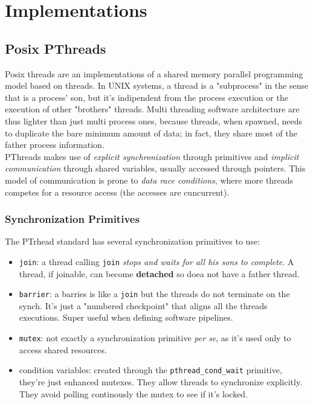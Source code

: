 \documentclass{article}
\begin{document}
	
	\clearpage
	\section{Implementations}
		\subsection{Posix PThreads}
			Posix threads are an implementations of a shared memory parallel programming model based on threads. In UNIX systems, a thread is a "subprocess" in the sense that is a process' son, but it's indipendent from the process execution or the execution of other "brothers" threads. Multi threading software architecture are thus lighter than just multi process ones, because threads, when spawned, needs to duplicate the bare minimum amount of data; in fact, they share most of the father process information.\\
			PThreads makes use of \textit{explicit synchronization} through primitives and \textit{implicit communication} through shared variables, usually accessed through pointers. This model of communication is prone to \textit{data race conditions}, where more threads competes for a resource access (the accesses are cuncurrent).

			\subsubsection{Synchronization Primitives}
				The PTrhead standard has several synchronization primitives to use:
				\begin{itemize}
					\item \verb|join|: a thread calling \verb|join| \textit{stops and waits for all his sons to complete}. A thread, if joinable, can become \textbf{detached} so doea not have a father thread.
					\item \verb|barrier|: a barries is like a \verb|join| but the threads do not terminate on the synch. It's just a "numbered checkpoint" that aligns all the threads executions. Super useful when defining software pipelines.
					\item \verb|mutex|: not exactly a synchronization primitive \textit{per se}, as it's used only to access shared resources.
					\item condition variables: created through the \verb|pthread_cond_wait| primitive, they're just enhanced mutexes. They allow threads to synchronize explicitly. They avoid polling continously the mutex to see if it's locked.
				\end{itemize}
\end{document}
